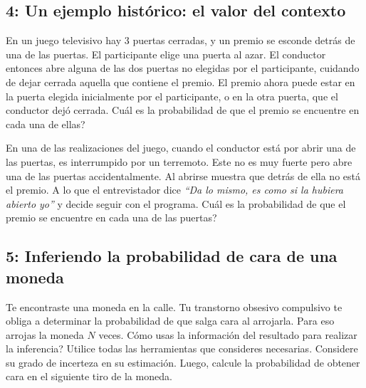 \subsection*{4: Un ejemplo hist\'orico: el valor del contexto}
En un juego televisivo hay 3 puertas cerradas, y un premio se esconde detr\'as de una de las puertas. El participante elige una puerta al azar. El conductor entonces abre alguna de las dos puertas no elegidas por el participante, cuidando de dejar cerrada aquella que contiene el premio. El premio ahora puede estar en la puerta elegida inicialmente por el participante, o en la otra puerta, que el conductor dej\'o cerrada. Cu\'al es la probabilidad de que el premio se encuentre en cada una de ellas?

En una de las realizaciones del juego, cuando el conductor est\'a por abrir una de las puertas, es interrumpido por un terremoto. Este no es muy fuerte pero abre una de las puertas accidentalmente. Al abrirse muestra que detr\'as de ella no est\'a el premio. A lo que el entrevistador dice {\it ``Da lo mismo, es como si la hubiera abierto yo''} y decide seguir con el programa. Cu\'al es la probabilidad de que el premio se encuentre en cada una de las puertas?


\subsection*{5: Inferiendo la probabilidad de cara de una moneda}
Te encontraste una moneda en la calle. Tu transtorno obsesivo compulsivo te obliga a determinar la probabilidad de que salga cara al arrojarla. Para eso arrojas la moneda $N$ veces. C\'omo usas la informaci\'on del resultado para realizar la inferencia? Utilice todas las herramientas que consideres necesarias. Considere su grado de incerteza en su estimaci\'on. Luego, calcule la probabilidad de obtener cara en el siguiente tiro de la moneda.